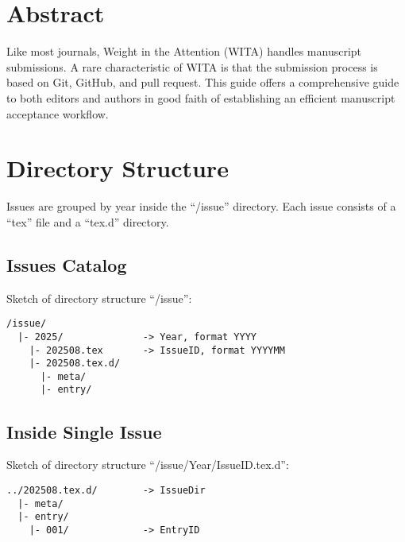 


\providecommand{\showcmd}[0]{}
\providecommand{\showcmdparam}[0]{}
\renewcommand{\showcmd}[1]{\strut{\textbackslash#1}}
\renewcommand{\showcmdparam}[1]{\strut\textbraceleft{#1}\textbraceright}





\section*{Abstract}
Like most journals, Weight in the Attention (WITA) handles manuscript submissions.
A rare characteristic of WITA is that the submission process is based on Git, GitHub, and pull request.
This guide offers a comprehensive guide to both editors and authors in good faith of establishing an efficient manuscript acceptance workflow.




\section{Directory Structure}
Issues are grouped by year inside the ``/issue'' directory.
Each issue consists of a ``tex'' file and a ``tex.d'' directory.


\subsection{Issues Catalog}
Sketch of directory structure ``/issue'':

\begin{lstlisting}
/issue/
  |- 2025/              -> Year, format YYYY
    |- 202508.tex       -> IssueID, format YYYYMM
    |- 202508.tex.d/
      |- meta/
      |- entry/
\end{lstlisting}


\subsection{Inside Single Issue}
Sketch of directory structure ``/issue/Year/IssueID.tex.d'':

\begin{lstlisting}
../202508.tex.d/        -> IssueDir
  |- meta/
  |- entry/
    |- 001/             -> EntryID
\end{lstlisting}


